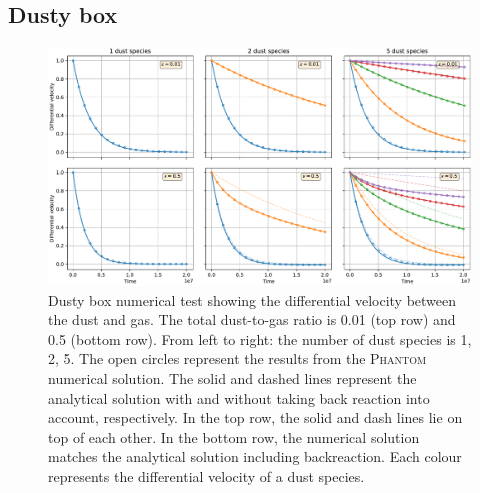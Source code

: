 \documentclass[fleqn,usenatbib]{mnras}
\begin{document}
\subsection{Dusty box}%
\label{subsec:box}

\begin{figure}
   \begin{center}
      \includegraphics[width=\textwidth]{figs/dustybox_differential_velocity_comparison.pdf}
      \caption{Dusty box numerical test showing the differential velocity
         between the dust and gas. The total dust-to-gas ratio is 0.01 (top row)
         and 0.5 (bottom row). From left to right: the number of dust species is
         1, 2, 5. The open circles represent the results from the
         \textsc{Phantom} numerical solution. The solid and dashed lines
         represent the analytical solution with and without taking back reaction
         into account, respectively. In the top row, the solid and dash lines
         lie on top of each other. In the bottom row, the numerical solution
         matches the analytical solution including backreaction. Each colour
         represents the differential velocity of a dust species.%
         \label{fig:dustybox}}
   \end{center}
\end{figure}
\end{document}
